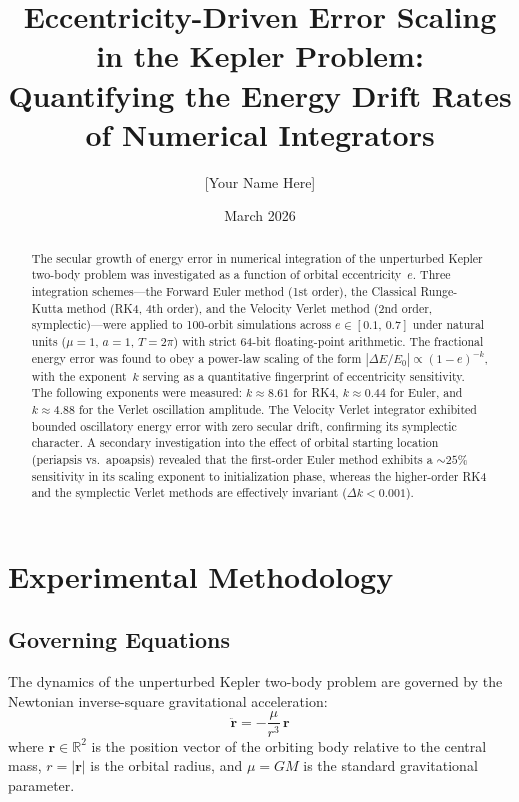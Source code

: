 \documentclass[twocolumn, 10pt]{article}
\title{\textbf{Eccentricity-Driven Error Scaling in the Kepler Problem:\\ Quantifying the Energy Drift Rates of Numerical Integrators}}
\author{[Your Name Here]}
\date{March 2026}
\begin{document}
\maketitle

\begin{abstract}
The secular growth of energy error in numerical integration of the unperturbed Kepler two-body problem was investigated as a function of orbital eccentricity~$e$. Three integration schemes---the Forward Euler method (1st order), the Classical Runge-Kutta method (RK4, 4th order), and the Velocity Verlet method (2nd order, symplectic)---were applied to 100-orbit simulations across $e \in [0.1,\, 0.7]$ under natural units ($\mu = 1$, $a = 1$, $T = 2\pi$) with strict 64-bit floating-point arithmetic. The fractional energy error was found to obey a power-law scaling of the form $|\Delta E / E_0| \propto (1 - e)^{-k}$, with the exponent~$k$ serving as a quantitative fingerprint of eccentricity sensitivity. The following exponents were measured: $k \approx 8.61$ for RK4, $k \approx 0.44$ for Euler, and $k \approx 4.88$ for the Verlet oscillation amplitude. The Velocity Verlet integrator exhibited bounded oscillatory energy error with zero secular drift, confirming its symplectic character. A secondary investigation into the effect of orbital starting location (periapsis vs.\ apoapsis) revealed that the first-order Euler method exhibits a ${\sim}25\%$ sensitivity in its scaling exponent to initialization phase, whereas the higher-order RK4 and the symplectic Verlet methods are effectively invariant ($\Delta k < 0.001$).
\end{abstract}

\section{Experimental Methodology}

\subsection{Governing Equations}

The dynamics of the unperturbed Kepler two-body problem are governed by the Newtonian inverse-square gravitational acceleration:
\begin{equation}
\ddot{\mathbf{r}} = -\frac{\mu}{r^3}\,\mathbf{r}
\label{eq:newton}
\end{equation}
where $\mathbf{r} \in \mathbb{R}^2$ is the position vector of the orbiting body relative to the central mass, $r = |\mathbf{r}|$ is the orbital radius, and $\mu = GM$ is the standard gravitational parameter.
\end{document}
